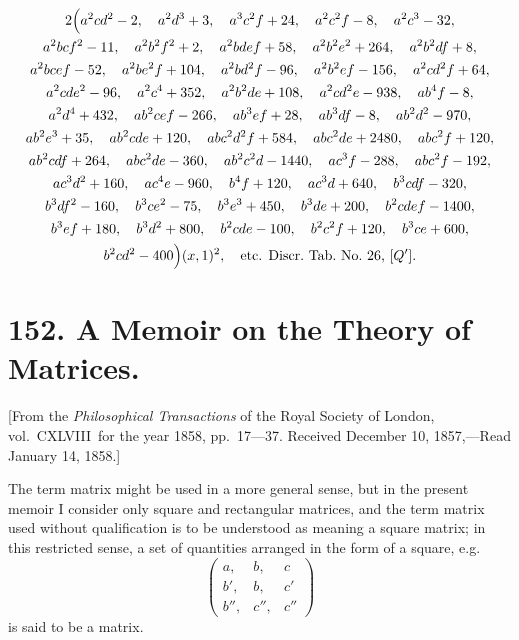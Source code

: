 \documentclass[12pt,a4paper]{article}
\theoremstyle{definition}
\begin{document}
\begin{multline*}
2\Bigl(
a^2cd^2 - 2,\quad a^2d^3 + 3,\quad a^3c^2f + 24,\quad a^2c^2f - 8,\quad a^2c^3 - 32,\\
a^2bcf^2 - 11,\quad a^2b^2f^2 + 2,\quad a^2bdef + 58,\quad a^2b^2e^2 + 264,\quad a^2b^2df + 8,\\
a^2bcef - 52,\quad a^2be^2f + 104,\quad a^2bd^2f - 96,\quad a^2b^2ef - 156,\quad a^2cd^2f + 64,\\
a^2cde^2 - 96,\quad a^2c^4 + 352,\quad a^2b^2de + 108,\quad a^2cd^2e - 938,\quad ab^4f - 8,\\
a^2d^4 + 432,\quad ab^2cef - 266,\quad ab^3ef + 28,\quad ab^3df - 8,\quad ab^2d^2 - 970,\\
ab^2e^3 + 35,\quad ab^2cde + 120,\quad abc^2d^2f + 584,\quad abc^2de + 2480,\quad abc^2f + 120,\\
ab^2cdf + 264,\quad abc^2de - 360,\quad ab^2c^2d - 1440,\quad ac^3f - 288,\quad abc^2f - 192,\\
ac^3d^2 + 160,\quad ac^4e - 960,\quad b^4f + 120,\quad ac^3d + 640,\quad b^3cdf - 320,\\
b^3df^2 - 160,\quad b^3ce^2 - 75,\quad b^3e^3 + 450,\quad b^3de + 200,\quad b^2cdef - 1400,\\
b^3ef + 180,\quad b^3d^2 + 800,\quad b^2cde - 100,\quad b^2c^2f + 120,\quad b^3ce + 600,\\
b^2cd^2 - 400
\Bigr)(x,1)^2, \quad \text{etc. Discr.~Tab.~No.~26, [$Q'$].}
\end{multline*}

\newpage

\section*{152. A Memoir on the Theory of Matrices.}

[From the \textit{Philosophical Transactions} of the Royal Society of London, vol.~CXLVIII\ for the year 1858, pp.~17---37.
Received December 10, 1857,---Read January 14, 1858.]

\bigskip

The term matrix might be used in a more general sense, but in the present memoir I consider only square and rectangular matrices, and the term matrix used without qualification is to be understood as meaning a square matrix; in this restricted sense, a set of quantities arranged in the form of a square, e.g.
\[
\begin{pmatrix}
a, & b, & c \\
b', & b, & c' \\
b'', & c'', & c''
\end{pmatrix}
\]
is said to be a matrix.
\end{document}
